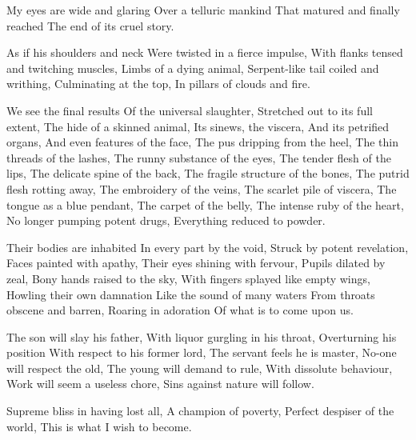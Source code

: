 \documentclass{article}
\newenvironment{stanza}{\begin{minipage}{10cm}\begin{internallinenumbers}\obeylines}{\end{internallinenumbers}\end{minipage}\vspace{\baselineskip}}
\begin{document}
\begin{stanza}
My eyes are wide and glaring
Over a telluric mankind
That matured and finally reached
The end of its cruel story.
\end{stanza}

\begin{stanza}
As if his shoulders and neck
Were twisted in a fierce impulse,
With flanks tensed and twitching muscles,
Limbs of a dying animal,
Serpent-like tail coiled and writhing,
Culminating at the top,
In pillars of clouds and fire.
\end{stanza}

\begin{stanza}
We see the final results
Of the universal slaughter,
Stretched out to its full extent,
The hide of a skinned animal,
Its sinews, the viscera,
And its petrified organs,
And even features of the face,
The pus dripping from the heel,
The thin threads of the lashes,
The runny substance of the eyes,
The tender flesh of the lips,
The delicate spine of the back,
The fragile structure of the bones,
The putrid flesh rotting away,
The embroidery of the veins,
The scarlet pile of viscera,
The tongue as a blue pendant,
The carpet of the belly,
The intense ruby of the heart,
No longer pumping potent drugs,
Everything reduced to powder.
\end{stanza}

\begin{stanza}
Their bodies are inhabited
In every part by the void,
Struck by potent revelation,
Faces painted with apathy,
Their eyes shining with fervour,
Pupils dilated by zeal,
Bony hands raised to the sky,
With fingers splayed like empty wings,
Howling their own damnation
Like the sound of many waters
From throats obscene and barren,
Roaring in adoration
Of what is to come upon us.
\end{stanza}

\begin{stanza}
The son will slay his father,
With liquor gurgling in his throat,
Overturning his position
With respect to his former lord,
The servant feels he is master,
No-one will respect the old,
The young will demand to rule,
With dissolute behaviour,
Work will seem a useless chore,
Sins against nature will follow.
\end{stanza}

\begin{stanza}
Supreme bliss in having lost all,
A champion of poverty,
Perfect despiser of the world,
This is what I wish to become.
\end{stanza}
\end{document}
